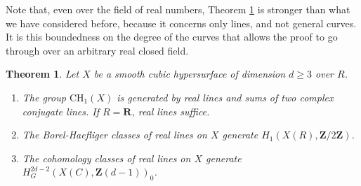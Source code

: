 \documentclass[JEP,XML,SOM,Unicode]{cedram}
\theoremstyle{plain}
\newtheorem{thm}{Theorem}[section]
\theoremstyle{definition}
\numberwithin{equation}{section}
\newcommand{\R}{{\mathbf R}}
\newcommand{\Z}{{\mathbf Z}}
\newcommand{\CH}{\mathrm{CH}}
\begin{document}
Note that, even over the field of real numbers, Theorem \ref{thm:cubiques} is stronger than what we have considered before, because it concerns only lines, and not general curves. It is this boundedness on the degree of the curves that allows the proof to go through over an arbitrary real closed field.

\begin{thm}
\label{thm:cubiques}
Let $X$ be a smooth cubic hypersurface of dimension $d\geq 3$ over $R$.
\begin{enumerate}
\item\label{thm:cubiquesi} The group $\CH_1(X)$ is generated by real lines and sums of two complex conjugate lines. If $R=\R$, real lines suffice.
\item\label{thm:cubiquesii} The Borel-Haefliger classes of real lines on $X$ generate $H_1(X(R),\Z/2\Z)$.
\item\label{thm:cubiquesiii} The cohomology classes of real lines on $X$ generate $H^{2d-2}_G(X(C),\Z(d-1))_0$.
\end{enumerate}
\end{thm}
\end{document}
